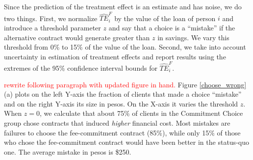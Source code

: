 \documentclass[oneside,11pt]{article}
\begin{document}


Since the prediction of the treatment effect is an estimate and has noise, we do two things. First, we normalize $\widehat{TE}^{F}_{i}$ by the value of the loan of person $i$ and introduce a threshold parameter $z$ and say that a choice is a ``mistake'' if the alternative contract would generate greater than $z$ in savings. We vary this threshold from 0\% to 15\% of the value of the loan. Second, we take into account uncertainty in estimation of treatment effects and report results using the extremes of the 95\% confidence interval bounds for $\widehat{TE}^{F}_{i}$.

\textcolor{red}{rewrite following paragraph with updated figure in hand.}
Figure \ref{choose_wrong}(a) plots on the left Y-axis the fraction of clients that made a choice ``mistake'' and on the right Y-axis its size in pesos. On the X-axis it varies the threshold $z$. When $z=0$, we calculate that about 75\% of clients in the Commitment Choice group chose contracts that induced \textit{higher} financial cost.  %
Most mistakes are failures to choose the fee-commitment contract ({85}\%), while only {15}\% of those who chose the fee-commitment contract would have been better in the status-quo one. The average mistake in pesos is \$250. %



 
\end{document}
